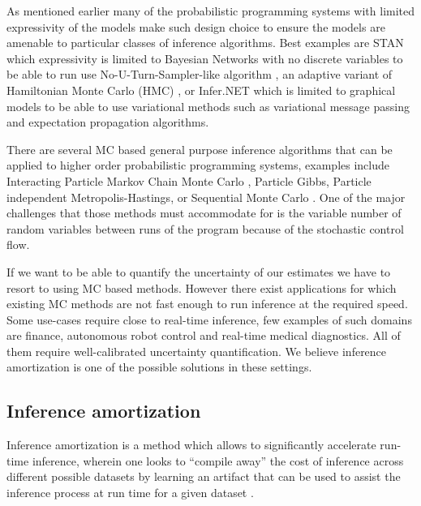\documentclass[12pt]{article}
\begin{document}
As mentioned earlier many of the probabilistic programming systems with limited expressivity of the models make such design choice to ensure the models are amenable to particular classes of inference algorithms. 
Best examples are STAN which expressivity is limited to Bayesian Networks with no discrete variables to be able to run use No-U-Turn-Sampler-like algorithm \citep{NUTS}, an adaptive variant of Hamiltonian Monte Carlo (HMC) \citep{HMC}, or Infer.NET which is limited to graphical models to be able to use variational methods such as variational message passing \citep{variationalmessagepassing} and expectation propagation \citep{EP} algorithms.


There are several MC based general purpose inference algorithms that can be applied to higher order probabilistic programming systems, examples include Interacting Particle Markov Chain Monte Carlo \citep{rainforth2016interacting}, Particle Gibbs, Particle independent Metropolis-Hastings, or Sequential Monte Carlo \citep{WoodEtAl2014}.
One of the major challenges that those methods must accommodate for is the variable number of random variables between runs of the program because of the stochastic control flow.  

If we want to be able to quantify the uncertainty of our estimates we have to resort to using MC based methods.
However there exist applications for which existing MC methods are not fast enough to run inference at the required speed.
Some use-cases require close to real-time inference, few examples of such domains are finance, autonomous robot control and real-time medical diagnostics. 
All of them require well-calibrated uncertainty quantification.
We believe inference amortization is one of the possible solutions in these settings.



\subsection{Inference amortization}

Inference amortization is a method which allows to significantly accelerate run-time inference, wherein one looks to ``compile away'' the cost of inference
across different possible datasets
by learning an artifact that can be used to assist the inference process
at run time for a given dataset
\citep{StuhlmullerEtAl2013, VAE, ritchie2016deep, PaigeWood2016, LeEtAl2016, LeEtAl2017, FIVO, NaessethEtAl2017}.
\end{document}
